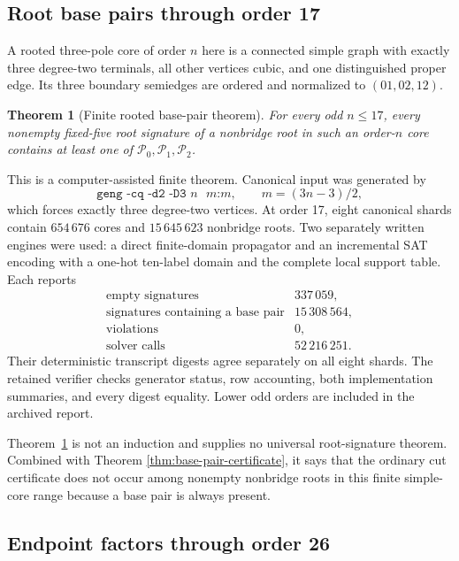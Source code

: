 \documentclass[11pt]{article}
\newtheorem{theorem}{Theorem}[section]
\theoremstyle{definition}
\theoremstyle{remark}
\begin{document}
\subsection{Root base pairs through order 17}

A rooted three-pole core of order \(n\) here is a connected simple
graph with exactly three degree-two terminals, all other vertices
cubic, and one distinguished proper edge.  Its three boundary
semiedges are ordered and normalized to \((01,02,12)\).

\begin{theorem}[Finite rooted base-pair theorem]
\label{thm:order17-base-pair}
For every odd \(n\leq17\), every nonempty fixed-five root signature of
a nonbridge root in such an order-\(n\) core contains at least one of
\(\mathcal P_0,\mathcal P_1,\mathcal P_2\).
\end{theorem}

This is a computer-assisted finite theorem.  Canonical input was
generated by
\[
 \texttt{geng -cq -d2 -D3 \(n\) \(m\):\(m\)},\qquad
 m=(3n-3)/2,
\]
which forces exactly three degree-two vertices.  At order 17, eight
canonical shards contain \(654\,676\) cores and \(15\,645\,623\)
nonbridge roots.  Two separately written engines were used: a direct
finite-domain propagator and an incremental SAT encoding with a
one-hot ten-label domain and the complete local support table.  Each
reports
\[
\begin{array}{lr}
\text{empty signatures}&337\,059,\\
\text{signatures containing a base pair}&15\,308\,564,\\
\text{violations}&0,\\
\text{solver calls}&52\,216\,251.
\end{array}
\]
Their deterministic transcript digests agree separately on all eight
shards.  The retained verifier checks generator status, row accounting,
both implementation summaries, and every digest equality.  Lower odd
orders are included in the archived report.

Theorem~\ref{thm:order17-base-pair} is not an induction and supplies no
universal root-signature theorem.  Combined with Theorem
\ref{thm:base-pair-certificate}, it says that the ordinary cut
certificate does not occur among nonempty nonbridge roots in this
finite simple-core range because a base pair is always present.

\subsection{Endpoint factors through order 26}
\end{document}
